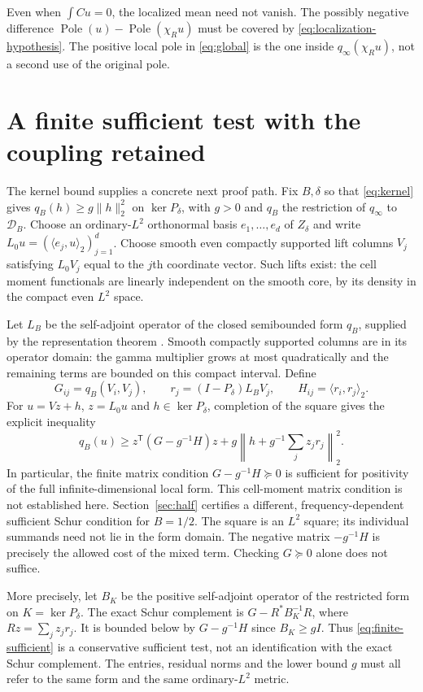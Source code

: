 \documentclass[11pt]{article}
\newcommand{\norm}[1]{\lVert#1\rVert}
\newcommand{\Pole}{\operatorname{Pole}}
\begin{document}
Even when $\int Cu=0$, the localized mean need not vanish. The possibly
negative difference $\Pole(u)-\Pole(\chi_Ru)$ must be covered by
\eqref{eq:localization-hypothesis}. The positive local pole in
\eqref{eq:global} is the one inside $q_\infty(\chi_Ru)$, not a second
use of the original pole.

\section{A finite sufficient test with the coupling retained}
The kernel bound supplies a concrete next proof path. Fix $B,\delta$ so that
\eqref{eq:kernel} gives $q_B(h)\ge g\norm h_2^2$ on $\ker P_\delta$,
with $g>0$ and $q_B$ the restriction of $q_\infty$ to $\mathcal D_B$.
Choose an ordinary-$L^2$ orthonormal basis $e_1,\ldots,e_d$ of $Z_\delta$
and write $L_0u=(\langle e_j,u\rangle_2)_{j=1}^d$.
Choose smooth even compactly supported lift columns $V_j$ satisfying
$L_0V_j$ equal to the $j$th coordinate vector. Such lifts exist: the cell
moment functionals are linearly independent on the smooth core, by its
density in the compact even $L^2$ space.

Let $L_B$ be the self-adjoint operator of the closed semibounded form
$q_B$, supplied by the representation theorem \cite[Chapter VI]{Kato}.
Smooth compactly supported columns are in its operator domain:
the gamma multiplier grows at most quadratically and the remaining terms
are bounded on this compact interval. Define
\[
 G_{ij}=q_B(V_i,V_j),\qquad
 r_j=(I-P_\delta)L_BV_j,\qquad
 H_{ij}=\langle r_i,r_j\rangle_2.
\]
For $u=Vz+h$, $z=L_0u$ and $h\in\ker P_\delta$, completion of the square
gives the explicit inequality
\begin{equation}
 \boxed{q_B(u)\ge
 z^{\mathsf T}(G-g^{-1}H)z
 +g\left\|h+g^{-1}\sum_jz_jr_j\right\|_2^2.}
 \label{eq:finite-sufficient}
\end{equation}
In particular, the finite matrix condition $G-g^{-1}H\succeq0$ is
sufficient for positivity of the full infinite-dimensional local form.
This cell-moment matrix condition is not established here.
Section~\ref{sec:half} certifies a different, frequency-dependent
sufficient Schur condition for $B=1/2$. The square is an $L^2$ square;
its individual summands need not lie in the form domain. The negative
matrix $-g^{-1}H$ is precisely the allowed cost of the mixed term.
Checking $G\succeq0$ alone does not suffice.

More precisely, let $B_K$ be the positive self-adjoint operator of the
restricted form on $K=\ker P_\delta$. The exact Schur complement is
$G-R^*B_K^{-1}R$, where $Rz=\sum_jz_jr_j$. It is bounded below by
$G-g^{-1}H$ since $B_K\ge gI$. Thus \eqref{eq:finite-sufficient} is a
conservative sufficient test, not an identification with the exact
Schur complement. The entries, residual norms and the lower bound $g$
must all refer to the same form and the same ordinary-$L^2$ metric.
\end{document}
